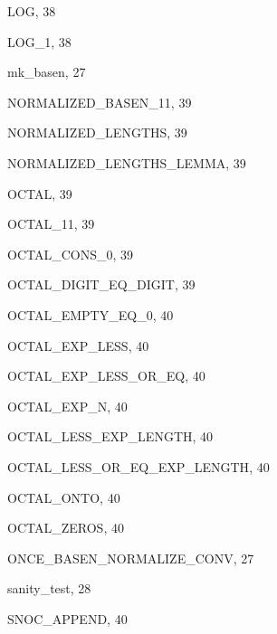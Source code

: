 \begin{theindex}
  \indexspace

  \item {\ptt LOG}, 38
  \item {\ptt LOG\_1}, 38

  \indexspace

  \item {\ptt mk\_basen}, 27

  \indexspace

  \item {\ptt NORMALIZED\_BASEN\_11}, 39
  \item {\ptt NORMALIZED\_LENGTHS}, 39
  \item {\ptt NORMALIZED\_LENGTHS\_LEMMA}, 39

  \indexspace

  \item {\ptt OCTAL}, 39
  \item {\ptt OCTAL\_11}, 39
  \item {\ptt OCTAL\_CONS\_0}, 39
  \item {\ptt OCTAL\_DIGIT\_EQ\_DIGIT}, 39
  \item {\ptt OCTAL\_EMPTY\_EQ\_0}, 40
  \item {\ptt OCTAL\_EXP\_LESS}, 40
  \item {\ptt OCTAL\_EXP\_LESS\_OR\_EQ}, 40
  \item {\ptt OCTAL\_EXP\_N}, 40
  \item {\ptt OCTAL\_LESS\_EXP\_LENGTH}, 40
  \item {\ptt OCTAL\_LESS\_OR\_EQ\_EXP\_LENGTH}, 40
  \item {\ptt OCTAL\_ONTO}, 40
  \item {\ptt OCTAL\_ZEROS}, 40
  \item {\ptt ONCE\_BASEN\_NORMALIZE\_CONV}, 27

  \indexspace

  \item {\ptt sanity\_test}, 28
  \item {\ptt SNOC\_APPEND}, 40

\end{theindex}
